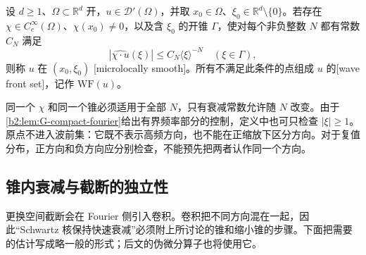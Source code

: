 \begin{definition}\label{b2:def:G-wavefront}
设 \(d\ge1\)、\(\Omega\subset\mathbb R^d\) 开，\(u\in\mathcal D'(\Omega)\)，并取 \(x_0\in\Omega\)、\(\xi_0\in\mathbb R^d\setminus\{0\}\)。若存在 \(\chi\in C_c^\infty(\Omega)\)、\(\chi(x_0)\ne0\)，以及含 \(\xi_0\) 的开锥 \(\Gamma\)，使对每个非负整数 \(N\) 都有常数 \(C_N\) 满足
\[
 |\widehat{\chi\cdot u}(\xi)|\le C_N\langle\xi\rangle^{-N}
 \quad(\xi\in\Gamma),
\]
则称 \(u\) 在 \((x_0,\xi_0)\) [microlocally smooth]。所有不满足此条件的点组成 \(u\) 的[wave front set]，记作 \(\mathrm{WF}(u)\)。
\end{definition}
同一个 \(\chi\) 和同一个锥必须适用于全部 \(N\)，只有衰减常数允许随 \(N\) 改变。由于\cref{b2:lem:G-compact-fourier}给出有界频率部分的控制，定义中也可只检查 \(|\xi|\ge1\)。原点不进入波前集：它既不表示高频方向，也不能在正缩放下区分方向。对于复值分布，正方向和负方向应分别检查，不能预先把两者认作同一个方向。

\subsection{锥内衰减与截断的独立性}
\label{b2:subsec:G0402}

更换空间截断会在 Fourier 侧引入卷积。卷积把不同方向混在一起，因此“Schwartz 核保持快速衰减”必须附上所讨论的锥和缩小锥的步骤。下面把需要的估计写成略一般的形式；后文的伪微分算子也将使用它。


